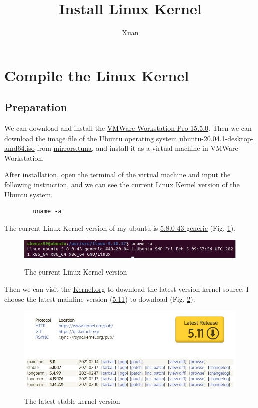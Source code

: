 \documentclass[a4paper, 12pt]{article}
\title{Install Linux Kernel}
\author{Xuan}
\theoremstyle{definition}
\begin{document}
    \maketitle
    \section{Compile the Linux Kernel}
    \subsection{Preparation}
    We can download and install the \underline{VMWare Workstation Pro 15.5.0}. Then we can download the image file of the Ubuntu operating system \underline{ubuntu-20.04.1-desktop-amd64.iso} from \href{https://mirrors.tuna.tsinghua.edu.cn/}{mirrors.tuna}, and install it as a virtual machine in VMWare Workstation.
    
    After installation, open the terminal of the virtual machine and input the following instruction, and we can see the current Linux Kernel version of the Ubuntu system.

    \begin{lstlisting}
        uname -a
    \end{lstlisting}

    The current Linux Kernel version of my ubuntu is \underline{5.8.0-43-generic} (Fig. \ref{fig1}).

    \begin{figure}[htbp]
        \centering
        \includegraphics[width=7in]{./pic/exe1/pic1.jpg}\\
        \caption{The current Linux Kernel version}\label{fig1}
    \end{figure}

    Then we can visit the \href{www.kernel.org}{Kernel.org} to download the latest version kernel source. I choose the latest mainline version (\underline{5.11}) to download (Fig. \ref{fig2}).

    \begin{figure}[htbp]
        \centering
        \includegraphics[width=7in]{./pic/exe1/pic2.jpg}\\
        \caption{The latest stable kernel version}\label{fig2}
    \end{figure}
\end{document}
